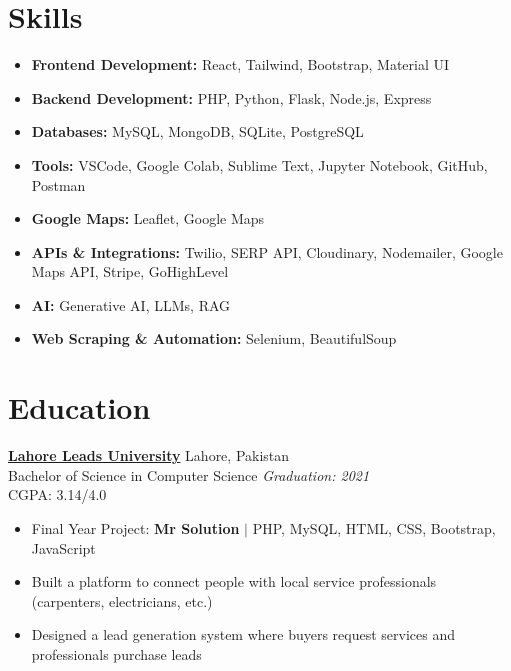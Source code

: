 \documentclass[a4paper,12pt]{article}
\begin{document}

\section{Skills}

\begin{itemize}[leftmargin=*]
    \item \textbf{Frontend Development:} React, Tailwind, Bootstrap, Material UI
    \item \textbf{Backend Development:} PHP, Python, Flask, Node.js, Express
    \item \textbf{Databases:} MySQL, MongoDB, SQLite, PostgreSQL
    \item \textbf{Tools:} VSCode, Google Colab, Sublime Text, Jupyter Notebook, GitHub, Postman
    \item \textbf{Google Maps:} Leaflet, Google Maps
    \item \textbf{APIs \& Integrations:} Twilio, SERP API, Cloudinary, Nodemailer, Google Maps API, Stripe, GoHighLevel
    \item \textbf{AI:} Generative AI, LLMs, RAG
    \item \textbf{Web Scraping \& Automation:} Selenium, BeautifulSoup
\end{itemize}


\section{Education}

\textbf{\href{https://leads.edu.pk/}{Lahore Leads University}} \hfill Lahore, Pakistan \\
Bachelor of Science in Computer Science \hfill \textit{Graduation: 2021} \\
CGPA: 3.14/4.0

\begin{itemize}[leftmargin=*]
    \item Final Year Project: \textbf{Mr Solution} $|$ PHP, MySQL, HTML, CSS, Bootstrap, JavaScript
    \item Built a platform to connect people with local service professionals (carpenters, electricians, etc.)
    \item Designed a lead generation system where buyers request services and professionals purchase leads
\end{itemize}
\end{document}

